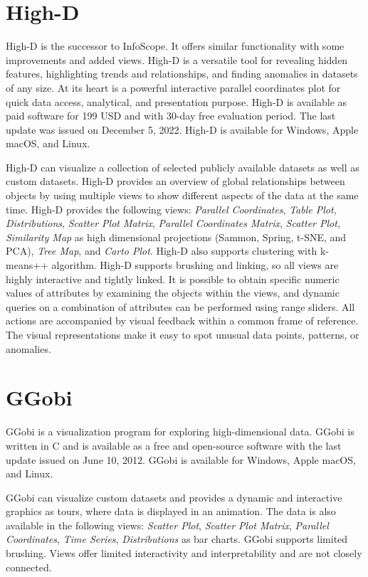 \section{High-D}

High-D \parencite{HighD} is the successor to InfoScope. It offers
similar functionality with some improvements and added views. High-D
is a versatile tool for revealing hidden features, highlighting trends
and relationships, and finding anomalies in datasets of any size. At
its heart is a powerful interactive parallel coordinates plot for
quick data access, analytical, and presentation purpose. High-D is
available as paid software for 199 USD and with 30-day free evaluation
period. The last update was issued on December 5, 2022. High-D is
available for Windows, Apple macOS, and Linux.


High-D can visualize a collection of selected publicly available
datasets as well as custom datasets. High-D provides an overview of
global relationships between objects by using multiple views to show
different aspects of the data at the same time. High-D provides the
following views: \emph{Parallel Coordinates}, \emph{Table Plot},
\emph{Distributions}, \emph{Scatter Plot Matrix}, \emph{Parallel
Coordinates Matrix}, \emph{Scatter Plot}, \emph{Similarity Map} as
high dimensional projections (Sammon, Spring, t-SNE, and PCA),
\emph{Tree Map}, and \emph{Carto Plot}. High-D also supports
clustering with k-means++ algorithm. High-D supports brushing and
linking, so all views are highly interactive and tightly linked. It is
possible to obtain specific numeric values of attributes by examining
the objects within the views, and dynamic queries on a combination of
attributes can be performed using range sliders. All actions are
accompanied by visual feedback within a common frame of reference. The
visual representations make it easy to spot unusual data points,
patterns, or anomalies.




\section{GGobi}

GGobi \parencite{cook2007interactive} is a visualization program for
exploring high-dimensional data. GGobi is written in C and is
available as a free and open-source software with the last update
issued on June 10, 2012. GGobi is available for Windows, Apple macOS,
and Linux.

GGobi can visualize custom datasets and provides a dynamic and
interactive graphics as tours, where data is displayed in an
animation. The data is also available in the following views:
\emph{Scatter Plot}, \emph{Scatter Plot Matrix}, \emph{Parallel
Coordinates}, \emph{Time Series}, \emph{Distributions} as bar
charts. GGobi supports limited brushing. Views offer limited
interactivity and interpretability and are not closely connected.


